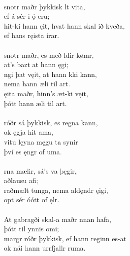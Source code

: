  \\

\bva {}snotr maðr \hld þykkisk lt vita, \\%
\ind ef á sér i ǫ́ eru; \\%
hit-ki hann ęit, \hld hvat hann skal ið kveða, \\%
\ind ef hans ręista irar.\\%

 \\

\bva {}snotr maðr, \hld es með ldir kømr, \\%
\ind {}at's bazt at hann ęgi; \\%
ngi þat vęit, \hld at hann kki kann, \\%
\ind nema hann æli til art. \\%
ęita maðr, \hld hinn's æt-ki vęit, \\%
\ind þótt hann æli til art.\\%

 \\

\bva {}róðr sá þykkisk, \hld es regna kann, \\%
\ind ok ęgja hit ama, \\%
vitu lęyna \hld męgu ta synir \\%
\ind því es ęngr of uma.\\%

 \\

\bva {}rna mælir, \hld sá's va þęgir, \\%
\ind {}aðlausu afi; \\%
raðmælt tunga, \hld nema aldęndr ęigi, \\%
\ind opt sér óótt of ęlr.\\%

 \\

\bva At gabragði \hld skal-a maðr nnan hafa, \\%
\ind þótt til ynnis omi; \\%
margr róðr þykkisk, \hld ef hann reginn es-at \\%
\ind ok nái hann urrfjallr ruma.\\%

